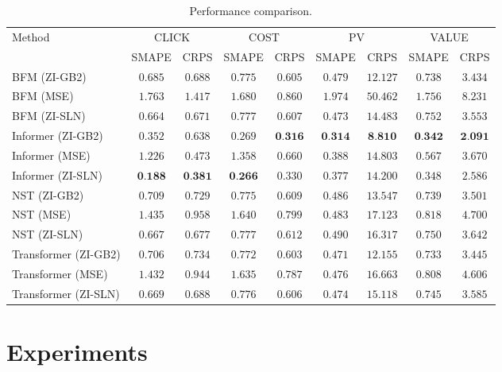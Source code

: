 \documentclass[sigconf, anonymous, review]{acmart}
\begin{document}
\begin{table}[htbp]
\centering
\caption{Performance comparison.}
\label{tab:perf_sub1_256}
\begin{tabular}{lcccccccc}
\toprule
Method & \multicolumn{2}{c}{CLICK} & \multicolumn{2}{c}{COST} & \multicolumn{2}{c}{PV} & \multicolumn{2}{c}{VALUE} \\
\cmidrule(lr){2-3} \cmidrule(lr){4-5} \cmidrule(lr){6-7} \cmidrule(lr){8-9}
 & SMAPE & CRPS & SMAPE & CRPS & SMAPE & CRPS & SMAPE & CRPS \\
\midrule
BFM (ZI-GB2) & $0.685$ & $0.688$ & $0.775$ & $0.605$ & $0.479$ & $12.127$ & $0.738$ & $3.434$ \\
BFM (MSE) & $1.763$ & $1.417$ & $1.680$ & $0.860$ & $1.974$ & $50.462$ & $1.756$ & $8.231$ \\
BFM (ZI-SLN) & $0.664$ & $0.671$ & $0.777$ & $0.607$ & $0.473$ & $14.483$ & $0.752$ & $3.553$ \\
Informer (ZI-GB2) & $0.352$ & $0.638$ & $0.269$ & $\textbf{0.316}$ & $\textbf{0.314}$ & $\textbf{8.810}$ & $\textbf{0.342}$ & $\textbf{2.091}$ \\
Informer (MSE) & $1.226$ & $0.473$ & $1.358$ & $0.660$ & $0.388$ & $14.803$ & $0.567$ & $3.670$ \\
Informer (ZI-SLN) & $\textbf{0.188}$ & $\textbf{0.381}$ & $\textbf{0.266}$ & $0.330$ & $0.377$ & $14.200$ & $0.348$ & $2.586$ \\
NST (ZI-GB2) & $0.709$ & $0.729$ & $0.775$ & $0.609$ & $0.486$ & $13.547$ & $0.739$ & $3.501$ \\
NST (MSE) & $1.435$ & $0.958$ & $1.640$ & $0.799$ & $0.483$ & $17.123$ & $0.818$ & $4.700$ \\
NST (ZI-SLN) & $0.667$ & $0.677$ & $0.777$ & $0.612$ & $0.490$ & $16.317$ & $0.750$ & $3.642$ \\
Transformer (ZI-GB2) & $0.706$ & $0.734$ & $0.772$ & $0.603$ & $0.471$ & $12.155$ & $0.733$ & $3.445$ \\
Transformer (MSE) & $1.432$ & $0.944$ & $1.635$ & $0.787$ & $0.476$ & $16.663$ & $0.808$ & $4.606$ \\
Transformer (ZI-SLN) & $0.669$ & $0.688$ & $0.776$ & $0.606$ & $0.474$ & $15.118$ & $0.745$ & $3.585$ \\
\bottomrule
\end{tabular}
\end{table}

\section{Experiments}
\label{sec:experiments}
\end{document}
